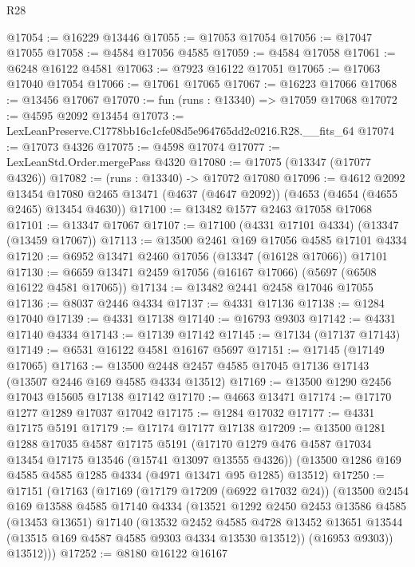 \begin{lexlean}{R28}
\begin{coremodule}
@17054 := @16229 @13446
@17055 := @17053 @17054
@17056 := @17047 @17055
@17058 := @4584 @17056 @4585
@17059 := @4584 @17058
@17061 := @6248 @16122 @4581
@17063 := @7923 @16122 @17051
@17065 := @17063 @17040 @17054
@17066 := @17061 @17065
@17067 := @16223 @17066
@17068 := @13456 @17067
@17070 := fun (runs : @13340) => @17059 @17068
@17072 := @4595 @2092 @13454
@17073 := LexLeanPreserve.C1778bb16c1cfe08d5e964765dd2c0216.R28.__fits_64
@17074 := @17073 @4326
@17075 := @4598 @17074
@17077 := LexLeanStd.Order.mergePass @4320
@17080 := @17075 (@13347 (@17077 @4326))
@17082 := (runs : @13340) -> @17072 @17080
@17096 := @4612
    @2092
    @13454
    @17080
    @2465
    @13471
    (@4637 (@4647 @2092))
    (@4653 (@4654 (@4655 @2465) @13454 @4630))
@17100 := @13482 @1577 @2463 @17058 @17068
@17101 := @13347 @17067
@17107 := @17100 (@4331 @17101 @4334) (@13347 (@13459 @17067))
@17113 := @13500 @2461 @169 @17056 @4585 @17101 @4334
@17120 := @6952 @13471 @2460 @17056 (@13347 (@16128 @17066)) @17101
@17130 := @6659 @13471 @2459 @17056 (@16167 @17066) (@5697 (@6508 @16122 @4581 @17065))
@17134 := @13482 @2441 @2458 @17046 @17055
@17136 := @8037 @2446 @4334
@17137 := @4331 @17136
@17138 := @1284 @17040
@17139 := @4331 @17138
@17140 := @16793 @9303
@17142 := @4331 @17140 @4334
@17143 := @17139 @17142
@17145 := @17134 (@17137 @17143)
@17149 := @6531 @16122 @4581 @16167 @5697
@17151 := @17145 (@17149 @17065)
@17163 := @13500 @2448 @2457 @4585 @17045 @17136 @17143 (@13507 @2446 @169 @4585 @4334 @13512)
@17169 := @13500 @1290 @2456 @17043 @15605 @17138 @17142
@17170 := @4663 @13471
@17174 := @17170 @1277 @1289 @17037 @17042
@17175 := @1284 @17032
@17177 := @4331 @17175 @5191
@17179 := @17174 @17177 @17138
@17209 := @13500
    @1281
    @1288
    @17035
    @4587
    @17175
    @5191
    (@17170 @1279 @476 @4587 @17034 @13454 @17175 @13546 (@15741 @13097 @13555 @4326))
    (@13500 @1286 @169 @4585 @4585 @1285 @4334 (@4971 @13471 @95 @1285) @13512)
@17250 := @17151
    (@17163
      (@17169
        (@17179 @17209 (@6922 @17032 @24))
        (@13500
          @2454
          @169
          @13588
          @4585
          @17140
          @4334
          (@13521
            @1292
            @2450
            @2453
            @13586
            @4585
            (@13453 @13651)
            @17140
            (@13532
              @2452
              @4585
              @4728
              @13452
              @13651
              @13544
              (@13515 @169 @4587 @4585 @9303 @4334 @13530 @13512))
            (@16953 @9303))
          @13512)))
@17252 := @8180 @16122 @16167

\end{coremodule}
\end{lexlean}
